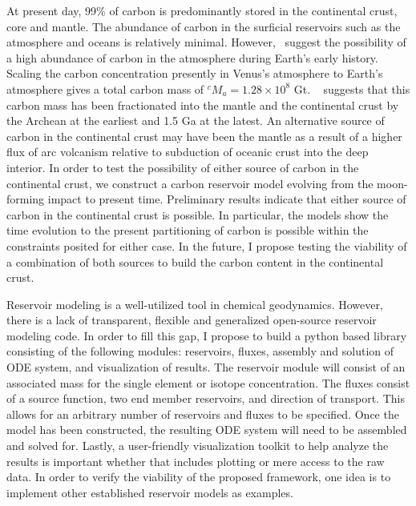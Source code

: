 At present day, 99\% of carbon is predominantly stored in the continental crust, core and mantle. The abundance of carbon in the surficial reservoirs such as the atmosphere and oceans is relatively minimal. However,~\citet{KJF-ATP:1986} suggest the possibility of a high abundance of carbon in the atmosphere during Earth's early history. Scaling the carbon concentration presently in Venus's atmosphere to Earth's atmosphere gives a total carbon mass of $^cM_{a} = 1.28 \times 10^8$ Gt. ~\citet{KJD:2002} suggests that this carbon mass has been fractionated into the mantle and the continental crust by the Archean at the earliest and 1.5 Ga at the latest. An alternative source of carbon in the continental crust may have been the mantle as a result of a higher flux of arc volcanism relative to subduction of oceanic crust into the deep interior. In order to test the possibility of either source of carbon in the continental crust, we construct a carbon reservoir model evolving from the moon-forming impact to present time. Preliminary results indicate that either source of carbon in the continental crust is possible. In particular, the models show the time evolution to the present partitioning of carbon is possible within the constraints posited for either case. In the future, I propose testing the viability of a combination of both sources to build the carbon content in the continental crust.

Reservoir modeling is a well-utilized tool in chemical geodynamics. However, there is a lack of transparent, flexible and generalized open-source reservoir modeling code. In order to fill this gap, I propose to build a python based library consisting of the following modules: reservoirs, fluxes, assembly and solution of ODE system, and visualization of results. The reservoir module will consist of an associated mass for the single element or isotope concentration. The fluxes consist of a source function, two end member reservoirs, and direction of transport. This allows for an arbitrary number of reservoirs and fluxes to be specified. Once the model has been constructed, the resulting ODE system will need to be assembled and solved for. Lastly, a user-friendly visualization toolkit to help analyze the results is important whether that includes plotting or mere access to the raw data. In order to verify the viability of the proposed framework, one idea is to implement other established reservoir models as examples.
